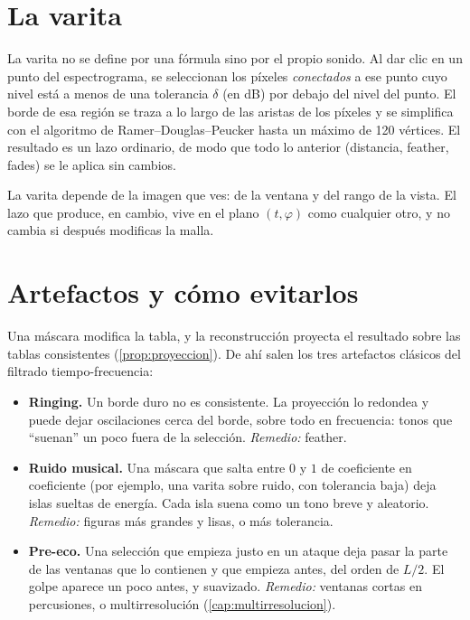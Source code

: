 \section{La varita}

La varita no se define por una fórmula sino por el propio sonido. Al dar clic en un punto del
espectrograma, se seleccionan los píxeles \emph{conectados} a ese punto cuyo nivel está a menos de
una tolerancia $\delta$ (en dB) por debajo del nivel del punto. El borde de esa región se traza a lo
largo de las aristas de los píxeles y se simplifica con el algoritmo de Ramer–Douglas–Peucker
hasta un máximo de 120 vértices. El resultado es un lazo ordinario, de modo que todo lo anterior
(distancia, feather, fades) se le aplica sin cambios.

La varita depende de la imagen que ves: de la ventana y del rango de la vista. El lazo que produce,
en cambio, vive en el plano $(t,\varphi)$ como cualquier otro, y no cambia si después modificas la
malla.

\section{Artefactos y cómo evitarlos}

Una máscara modifica la tabla, y la reconstrucción proyecta el resultado sobre las tablas
consistentes (\cref{prop:proyeccion}). De ahí salen los tres artefactos clásicos del filtrado
tiempo-frecuencia:
\begin{itemize}
  \item \textbf{Ringing.} Un borde duro no es consistente. La proyección lo redondea y puede dejar
        oscilaciones cerca del borde, sobre todo en frecuencia: tonos que ``suenan'' un poco fuera
        de la selección. \emph{Remedio:} feather.
  \item \textbf{Ruido musical.} Una máscara que salta entre $0$ y $1$ de coeficiente en coeficiente
        (por ejemplo, una varita sobre ruido, con tolerancia baja) deja islas sueltas de energía.
        Cada isla suena como un tono breve y aleatorio. \emph{Remedio:} figuras más grandes y
        lisas, o más tolerancia.
  \item \textbf{Pre-eco.} Una selección que empieza justo en un ataque deja pasar la parte de las
        ventanas que lo contienen y que empieza antes, del orden de $L/2$. El golpe aparece un poco
        antes, y suavizado. \emph{Remedio:} ventanas cortas en percusiones, o multirresolución
        (\cref{cap:multirresolucion}).
\end{itemize}
